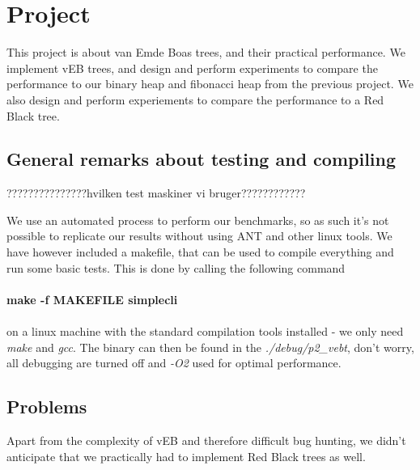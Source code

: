 \section*{Project}
This project is about van Emde Boas trees, and their practical performance. We implement vEB trees, and design and perform experiments to compare the performance to our binary heap and fibonacci heap from the previous project. We also design and perform experiements to compare the performance to a Red Black tree.

\subsection*{General remarks about testing and compiling}
???????????????hvilken test maskiner vi bruger????????????

We use an automated process to perform our benchmarks, so as such it's not possible to replicate our results without using ANT and other linux tools. We have however included a makefile, that can be used to compile everything and run some basic tests. This is done by calling the following command\\
\\
\textbf{make -f MAKEFILE simplecli}\\
\\
on a linux machine with the standard compilation tools installed - we only need \textit{make} and \textit{gcc}. The binary can then be found in the \textit{./debug/p2\_vebt}, don't worry, all debugging are turned off and \textit{-O2} used for optimal performance.

\subsection*{Problems}
Apart from the complexity of vEB and therefore difficult bug hunting, we didn't anticipate that we practically had to implement Red Black trees as well.
